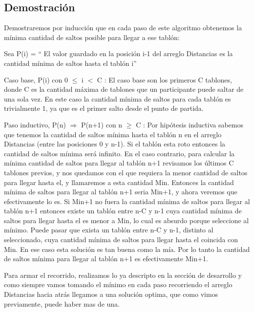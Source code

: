 \subsection{Demostraci\'on}

Demostraremos por inducci\'on que en cada paso de este algoritmo obtenemos la m\'inima cantidad de saltos posible para llegar a ese tabl\'on:

Sea P(i) = `` El valor guardado en la posici\'on i-1 del arreglo Distancias es la cantidad m\'inima de saltos hasta el tabl\'on i''

Caso base, P(i) con 0 $\leq$ i $<$ C :
El caso base son los primeros C tablones, donde C es la cantidad m\'axima de tablones que un participante puede saltar de una sola vez. En este caso la cantidad m\'inima de saltos para cada tabl\'on es trivialmente 1, ya que es el primer salto desde el punto de partida.

Paso inductivo, P(n) $ \Rightarrow $ P(n+1) con n $\geq$ C :
Por hip\'otesis inductiva sabemos que tenemos la cantidad de saltos m\'inima hasta el tabl\'on n en el arreglo Distancias (entre las posiciones 0 y n-1). Si el tabl\'on esta roto entonces la cantidad de saltos m\'inima ser\'a infinito. En el caso contrario, para calcular la m\'inima cantidad de saltos para llegar al tabl\'on n+1 revisamos los \'ultimos C tablones previos, y nos quedamos con el que requiera la menor cantidad de saltos para llegar hasta el, y llamaremos a esta cantidad Min. Entonces la cantidad m\'inima de saltos para llegar al tabl\'on n+1 seria Min+1, y ahora veremos que efectivamente lo es.
Si Min+1 no fuera la cantidad m\'inima de saltos para llegar al tabl\'on n+1 entonces existe un tabl\'on entre n-C y n-1 cuya cantidad m\'inima de saltos para llegar hasta el es menor a Min, lo cual es absurdo porque seleccione al m\'inimo.
Puede pasar que exista un tabl\'on entre n-C y n-1, distinto al seleccionado, cuya cantidad m\'inima de saltos para llegar hasta el coincida con Min. En ese caso esta soluci\'on es tan buena como la m\'ia. Por lo tanto la cantidad de saltos m\'inima para llegar al tabl\'on n+1 es efectivamente Min+1.

Para armar el recorrido, realizamos lo ya descripto en la secci\'on de desarrollo y como siempre vamos tomando el m\'inimo en cada paso recorriendo el arreglo Distancias hacia atr\'as llegamos a una soluci\'on optima, que como vimos previamente, puede haber mas de una. 



